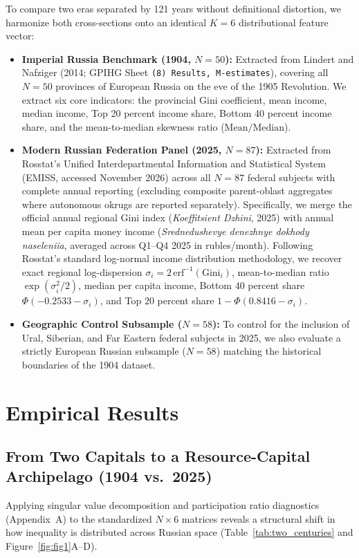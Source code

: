 \documentclass[11pt,a4paper]{article}
\begin{document}
To compare two eras separated by 121 years without definitional distortion, we harmonize both cross-sections onto an identical $K = 6$ distributional feature vector:
\begin{itemize}
    \item \textbf{Imperial Russia Benchmark (1904, $N = 50$):} Extracted from Lindert and Nafziger (2014; GPIHG Sheet \texttt{(8) Results, M-estimates}), covering all $N = 50$ provinces of European Russia on the eve of the 1905 Revolution. We extract six core indicators: the provincial Gini coefficient, mean income, median income, Top 20 percent income share, Bottom 40 percent income share, and the mean-to-median skewness ratio ($\mathrm{Mean}/\mathrm{Median}$).
    \item \textbf{Modern Russian Federation Panel (2025, $N = 87$):} Extracted from Rosstat's Unified Interdepartmental Information and Statistical System (EMISS, accessed November 2026) across all $N = 87$ federal subjects with complete annual reporting (excluding composite parent-oblast aggregates where autonomous okrugs are reported separately). Specifically, we merge the official annual regional Gini index (\emph{Koeffitsient Dzhini}, 2025) with annual mean per capita money income (\emph{Srednedushevye denezhnye dokhody naseleniia}, averaged across Q1--Q4 2025 in rubles/month). Following Rosstat's standard log-normal income distribution methodology, we recover exact regional log-dispersion $\sigma_i = 2\,\mathrm{erf}^{-1}(\mathrm{Gini}_i)$, mean-to-median ratio $\exp(\sigma_i^2/2)$, median per capita income, Bottom 40 percent share $\Phi(-0.2533 - \sigma_i)$, and Top 20 percent share $1 - \Phi(0.8416 - \sigma_i)$.
    \item \textbf{Geographic Control Subsample ($N = 58$):} To control for the inclusion of Ural, Siberian, and Far Eastern federal subjects in 2025, we also evaluate a strictly European Russian subsample ($N = 58$) matching the historical boundaries of the 1904 dataset.
\end{itemize}

\section{Empirical Results}

\subsection{From Two Capitals to a Resource-Capital Archipelago (1904 vs.\ 2025)}
Applying singular value decomposition and participation ratio diagnostics (Appendix~A) to the standardized $N \times 6$ matrices reveals a structural shift in how inequality is distributed across Russian space (Table~\ref{tab:two_centuries} and Figure~\ref{fig:fig1}A--D).
\end{document}
